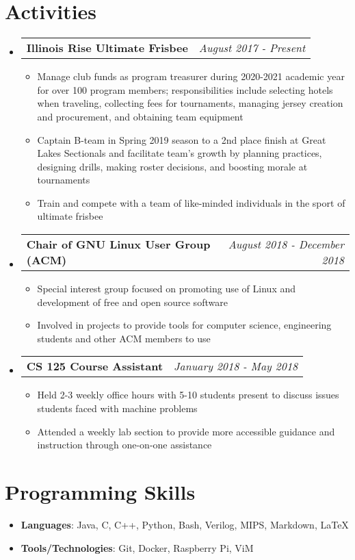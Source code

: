 \documentclass[letterpaper,11pt]{article}
\makeatletter
\newcommand{\resumeBullet}[1]
{\item[$\bullet$]\small
	{#1 \vspace{-1pt}
	}
}
\newcommand{\resumeSubheading}[2]
{\vspace{-1pt}\item[]\small
	\begin{tabular*}{0.97\textwidth}{l@{\extracolsep{\fill}}r}
		\textbf{#1} & \textit{\small #2} \\
	\end{tabular*}\vspace{-6pt}
}
\newcommand{\resumeSubHeadingListStart}{\begin{itemize}[leftmargin=*,itemsep=0.2pt]}
\newcommand{\resumeSubHeadingListEnd}{\end{itemize}}
\newcommand{\resumeItemListStart}{\begin{itemize}[itemsep=0.2pt]}
\newcommand{\resumeItemListEnd}{\end{itemize}\vspace{-5pt}}
\makeatother
\begin{document}
\section{Activities}
  \resumeSubHeadingListStart
  \resumeSubheading
  {Illinois Rise Ultimate Frisbee}{August 2017 - Present}
  \resumeItemListStart
  	\resumeBullet
  	{Manage club funds as program treasurer during  2020-2021 academic year for over 100 program members; responsibilities include selecting hotels when traveling, collecting fees for
tournaments, managing jersey creation and procurement, and obtaining team equipment}
  	\resumeBullet
  	{Captain B-team in Spring 2019 season to a 2nd place finish at Great Lakes Sectionals and facilitate team's growth by planning practices, designing drills, making roster decisions, and boosting morale at tournaments}
  	\resumeBullet
  	{Train and compete with a team of like-minded individuals in the sport of ultimate frisbee}
  \resumeItemListEnd
  	\resumeSubheading
  	{Chair of GNU Linux User Group (ACM)}{August 2018 - December 2018}
  	\resumeItemListStart
  		\resumeBullet
  		{Special interest group focused on promoting use of Linux and development of free and open source software}
  		\resumeBullet
  		{Involved in projects to provide tools for computer science, engineering students and other ACM members to use}
  	\resumeItemListEnd
  	\resumeSubheading
  	{CS 125 Course Assistant}{January 2018 - May 2018}
  	\resumeItemListStart
  	\resumeBullet
  	{Held 2-3 weekly office hours with 5-10 students present to discuss issues students faced with machine problems}
  	\resumeBullet
  	{Attended a weekly lab section to provide more accessible guidance and instruction through one-on-one assistance}
  	\resumeItemListEnd
  \resumeSubHeadingListEnd

\section{Programming Skills}
  \resumeSubHeadingListStart
  	\item[]\small{
        \textbf{Languages}{: Java, C, C++, Python, Bash, Verilog, MIPS, Markdown, LaTeX}
    }
	\item[]{
      	\textbf{Tools/Technologies}{: Git, Docker, Raspberry Pi, ViM}
    }
\resumeSubHeadingListEnd

\end{document}
